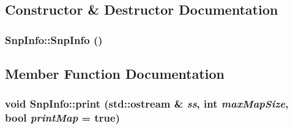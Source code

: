 \subsection{Constructor \& Destructor Documentation}
\hypertarget{classSnpInfo_a65b651b47027f6f55b082b063a183471}{
\subsubsection[{SnpInfo}]{\setlength{\rightskip}{0pt plus 5cm}SnpInfo::SnpInfo ()}}
\label{classSnpInfo_a65b651b47027f6f55b082b063a183471}


\subsection{Member Function Documentation}
\hypertarget{classSnpInfo_aadc0bad527f131f3294847b552241f32}{
\subsubsection[{print}]{\setlength{\rightskip}{0pt plus 5cm}void SnpInfo::print (std::ostream \& {\em ss}, \/  int {\em maxMapSize}, \/  bool {\em printMap} = {\ttfamily true})}}
\label{classSnpInfo_aadc0bad527f131f3294847b552241f32}


